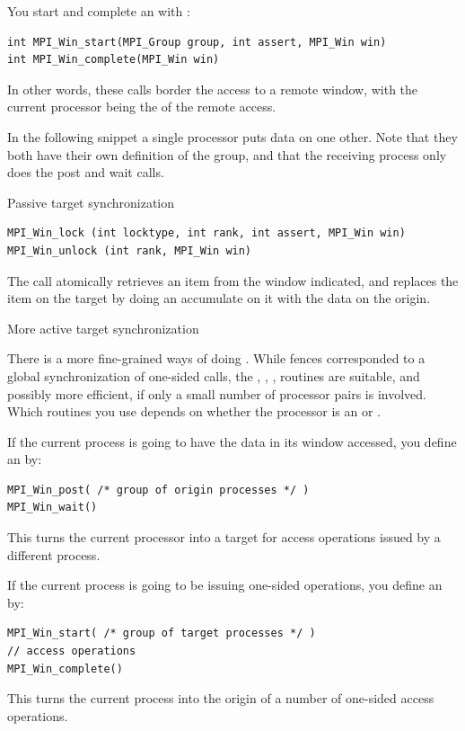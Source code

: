 You start and complete an  with%
:
\begin{verbatim}
int MPI_Win_start(MPI_Group group, int assert, MPI_Win win)
int MPI_Win_complete(MPI_Win win)
\end{verbatim}
In other words, these calls border the access to a remote window, with the current processor
being the  of the remote access.

In the following snippet a single processor puts data on one
other. Note that they both have their own definition of the group, and
that the receiving process only does the post and wait calls.

 {Passive target synchronization}
\label{sec:ref:passive-sync}

\begin{verbatim}
MPI_Win_lock (int locktype, int rank, int assert, MPI_Win win)
MPI_Win_unlock (int rank, MPI_Win win)
\end{verbatim}

The  call atomically retrieves an item from the window
indicated, and replaces the item on the target by doing an accumulate on it
with the data on the origin.
%

 {More active target synchronization}
\label{sec:post-wait}

There is a more fine-grained ways of doing 
. While fences
corresponded to a global synchronization of one-sided calls,
the ,
, ,  routines
are suitable, and possibly more efficient,
if only a small number of processor pairs is
involved.  Which routines
you use depends on whether the processor is an  or
.

If the current process is going to have the data in its window accessed,
you define an  by:
\begin{verbatim}
MPI_Win_post( /* group of origin processes */ )
MPI_Win_wait()
\end{verbatim}
This turns the current processor into a target for access operations issued
by a different process.

If the current process is going to be issuing one-sided operations,
you define an  by:
\begin{verbatim}
MPI_Win_start( /* group of target processes */ )
// access operations
MPI_Win_complete()
\end{verbatim}
This turns the current process into the origin of a number of
one-sided access operations.

